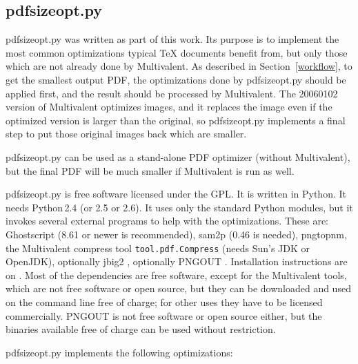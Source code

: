 \documentclass{ltugproc}
\def\cmd{\textsf}
\begin{document}
\subsection{pdfsizeopt.py}

\cmd{pdfsizeopt.py} \cite{pdfsizeopt} was written as part of this work. Its purpose is to
implement the most common optimizations typical \TeX{} documents benefit
from, but only those which are not already done by Multivalent. As described
in Section~\ref{workflow}, to get the smallest output PDF, the optimizations
done by \cmd{pdfsizeopt.py} should be applied first, and the result should
be processed by Multivalent. The 20060102 version of Multivalent
optimizes images, and it replaces the image even if the optimized version is
larger than the original, so \cmd{pdfsizeopt.py} implements a final step
to put those original images back which are smaller. 

\cmd{pdfsizeopt.py} can be used as a stand-alone PDF optimizer (without
Multivalent), but the final PDF will be much smaller if Multivalent
is run as well.

\cmd{pdfsizeopt.py} is free software licensed under the GPL. It is written
in Python. It needs Python\,2.4 (or 2.5 or 2.6). It uses only the standard
Python modules, but it invokes several external programs to help with the
optimizations. These are: Ghostscript (8.61 or newer is recommended),
\cmd{sam2p} \cite{sam2p} (0.46 is needed), pngtopnm,
the Multivalent compress tool \texttt{tool.pdf.Compress}
\cite{multivalent-compress-tool} (needs Sun's JDK or OpenJDK), 
optionally \cmd{jbig2} \cite{jbig2enc}, optionally PNGOUT \cite{pngout}.
Installation instructions are on \cite{pdfsizeopt-install}. Most of the
dependencies are free software, except for the Multivalent tools, which
are not free software or open source, but they can be downloaded and used on
the command line free of charge; for other uses they have to be licensed
commercially. PNGOUT is not free software or open source either, but the
binaries available free of charge can be used without restriction.

\cmd{pdfsizeopt.py} implements the following optimizations:
\end{document}
